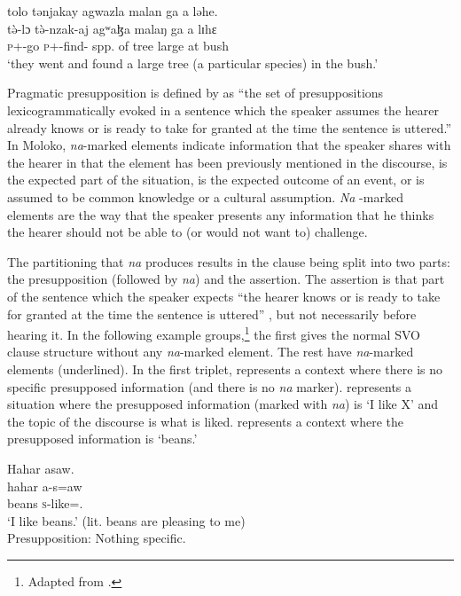      \medskip
tolo  tənjakay  agwazla  malan  ga  a  ləhe.\\      
\gll t\`{ə}-lɔ t\`{ə}-nzak-aj agʷaɮa malaŋ ga a lɪhɛ\\
     \textsc{p}+{\PFV}-go \textsc{p}+{\PFV}-find{}-{\CL} {spp. of tree}  large {\ADJ} at bush\\
\glt  ‘they went and found a large tree (a particular species) in the bush.’
\z

Pragmatic presupposition is defined by \citet[52]{Lambrecht1994} as “the set of presuppositions lexicogrammatically evoked in a sentence which the speaker assumes the hearer already knows or is ready to take for granted at the time the sentence is uttered.”  In Moloko, \textit{na}{}-marked elements indicate information that the speaker shares with the hearer in that the element has been previously mentioned in the discourse, is the expected part of the situation, is the expected outcome of an event, or is assumed to be common knowledge or a cultural assumption. \textit{Na} -marked elements are the way that the speaker presents any information that he thinks the hearer should not be able to (or would not want to) challenge. 

\largerpage
The partitioning that \textit{na} produces results in the clause being split into two parts:  the presupposition (followed by \textit{na}) and the assertion. The assertion is that part of the sentence which the speaker expects “the hearer knows or is ready to take for granted at the time the sentence is uttered” \citep[52]{Lambrecht1994}, but not necessarily before hearing it.  In the following example groups,\footnote{Adapted from \citealt{Boyd2002}.} the first gives the normal SVO clause structure without any \textit{na}{}-marked element. The rest have \textit{na}-marked elements (underlined). In the first triplet,  represents a context where there is no specific presupposed information (and there is no \textit{na} marker).  represents a situation where the presupposed information (marked with  \textit{na}) is ‘I like X’ and the topic of the discourse is what is liked.  represents a context where the presupposed information is ‘beans.’

\ea \label{ex:11:5}
Hahar  asaw. \\
\gll  hahar   a-s=aw \\
      beans   \textsc{s}-like={\oneS}.{\IO}\\
\glt  ‘I like beans.’ (lit. beans are pleasing to me) \\
  Presupposition:     Nothing specific.
\z

